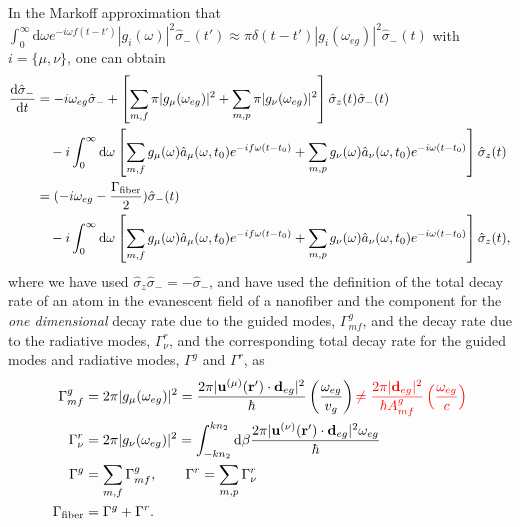 \documentclass[preprint,aps,pra,onecolumn]{revtex4-1} %
\begin{document}
In the Markoff approximation that $\int_0^\infty \mathrm{d}\omega e^{-i\omega f(t-t')} |g_i(\omega)|^2\hat{\sigma}_-(t')\approx \pi \delta(t-t')|g_i(\omega_{eg})|^2\hat{\sigma}_-(t)$ with $ i=\{\mu,\nu \} $, one can obtain
\begin{align}
\frac{{\mathrm d} {\hat{\sigma}_-}}{{\mathrm d}t} &= -i\omega_{eg} \hat{\sigma}_- + \left[ \sum_{m,f} \pi |g_\mu(\omega_{eg})|^2 +\sum_{m,p} \pi |g_\nu(\omega_{eg})|^2\right] \hat{\sigma}_z(t)\hat{\sigma}_-(t) \nonumber\\
&\quad - i\int_0^\infty \mathrm{d}\omega \left[ \sum_{m,f} g_\mu(\omega) \hat{a}_\mu(\omega,t_0) e^{-if\omega (t-t_0)}+\sum_{m,p} g_\nu(\omega) \hat{a}_\nu(\omega,t_0) e^{-i\omega (t-t_0)} \right]\hat{\sigma}_z(t)\\
&= (-i\omega_{eg}-\frac{\Gamma_{\rm fiber}}{2})\hat{\sigma}_-(t) \nonumber \\
&\quad -i\int_0^\infty \mathrm{d}\omega \left[ \sum_{m,f} g_\mu(\omega) \hat{a}_\mu(\omega,t_0)e^{-if\omega (t-t_0)}+ \sum_{m,p} g_\nu(\omega) \hat{a}_\nu(\omega,t_0)e^{-i\omega (t-t_0)} \right] \hat{\sigma}_z(t) , \label{eq:dsigma-t}
\end{align}
where we have used $\hat{\sigma}_z\hat{\sigma}_-=-\hat{\sigma}_- $, and have used the definition of the total decay rate of an atom in the evanescent field of a nanofiber and the component for the \textit{one dimensional} decay rate due to the guided modes, $\Gamma^g_{mf} $, and the decay rate due to the radiative modes, $\Gamma^r_{\nu} $, and the corresponding total decay rate for the guided modes and radiative modes, $ \Gamma^g $ and $ \Gamma^r $, as
\begin{align}
\Gamma^g_{mf} &= 2\pi |g_\mu(\omega_{eg})|^2= \frac{2\pi|\mathbf{u}^{(\mu)}(\mathbf{r}')\cdot \mathbf{d}_{eg}|^2}{\hbar }\left( \frac{\omega_{eg}}{v_g}\right) \mathbin{\color{red} \neq \frac{2\pi|\mathbf{d}_{eg}|^2}{\hbar A^g_{mf} }\left( \frac{\omega_{eg}}{c}\right)}\\
\Gamma^r_{\nu} &= 2\pi |g_\nu(\omega_{eg})|^2=\int_{-kn_2}^{kn_2}\mathrm{d}\beta \frac{2\pi|\mathbf{u}^{(\nu)}(\mathbf{r}')\cdot \mathbf{d}_{eg}|^2\omega_{eg}}{\hbar } \\
\Gamma^g &= \sum_{m,f}\Gamma^g_{mf},\quad\quad \Gamma^r = \sum_{m,p}\Gamma^r_{\nu}\\
\Gamma_{\rm fiber} &= \Gamma^g+\Gamma^r. 
\end{align}
\end{document}
